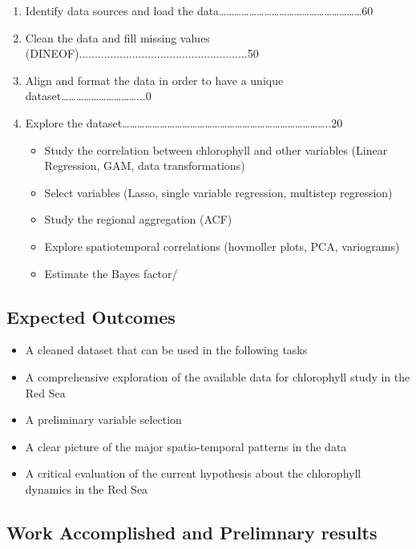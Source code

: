 \begin{enumerate}
\item Identify data sources and load the data…………………………………………………60%
\item Clean the data and fill missing values (DINEOF)......................................................50%
\item Align and format the data in order to have a unique dataset…………………………...0%
\item Explore the dataset………………………………………………………………………..20%
\begin{itemize}
\item Study the correlation between chlorophyll and other variables (Linear Regression, GAM, data transformations)
\item Select variables (Lasso, single variable regression, multistep regression)
\item Study the regional aggregation (ACF)
\item Explore spatiotemporal correlations (hovmoller plots, PCA, variograms)
\item Estimate the Bayes factor/ %
\end{itemize}
\end{enumerate}

\subsection{Expected Outcomes}

\begin{itemize}
\item A cleaned dataset that can be used in the following tasks
\item A comprehensive exploration of the available data for chlorophyll study in the Red Sea
\item A preliminary variable selection
\item A clear picture of the major spatio-temporal patterns in the data
\item A critical evaluation of the current hypothesis about the chlorophyll dynamics in the Red Sea
\end{itemize}

\subsection{Work Accomplished and Prelimnary results}
